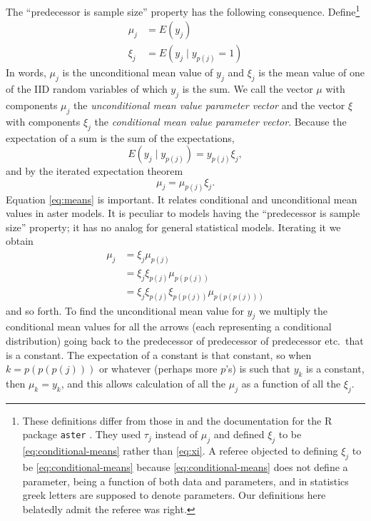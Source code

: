 \documentclass[11pt]{article}
\begin{document}
The ``predecessor is sample size'' property has the following consequence.
Define\footnote{These definitions differ from those in \citet{aster1} and the
documentation for the R package \texttt{aster} \citep{aster-package}.  They used
$\tau_j$ instead of $\mu_j$ and defined $\xi_j$ to
be \eqref{eq:conditional-means} rather than \eqref{eq:xi}.  A referee objected
to defining $\xi_j$ to be \eqref{eq:conditional-means} because
\eqref{eq:conditional-means} does not define a parameter, being a function
of both data and parameters, and in statistics greek letters are supposed to
denote parameters.  Our definitions here belatedly admit the referee was right.}
\begin{subequations}
\begin{align}
   \mu_j & = E(y_j)
   \\
   \xi_j & = E(y_j \mid y_{p(j)} = 1)
   \label{eq:xi}
\end{align}
\end{subequations}
In words, $\mu_j$ is the unconditional mean value of $y_j$ and $\xi_j$ is
the mean value of one of the IID random variables of which $y_j$
is the sum.  We call the vector $\mu$ with components $\mu_j$ the
\emph{unconditional mean value parameter vector}
and the vector $\xi$ with components $\xi_j$
the \emph{conditional mean value parameter vector}.
Because the expectation of a sum is
the sum of the expectations,
\begin{equation} \label{eq:conditional-means}
   E(y_j \mid y_{p(j)}) = y_{p(j)} \xi_j,
\end{equation}
and by the iterated expectation theorem
\begin{equation} \label{eq:means}
   \mu_j = \mu_{p(j)} \xi_j.
\end{equation}
Equation \eqref{eq:means} is important.  It relates conditional
and unconditional mean values in aster models.  It is peculiar to models
having the ``predecessor is sample size'' property; it has no analog
for general statistical models.  Iterating it we obtain
\begin{equation} \label{eq:xi-to-mu}
\begin{split}
   \mu_j & = \xi_j \mu_{p(j)}
   \\
   & = \xi_j \xi_{p(j)} \mu_{p(p(j))}
   \\
   & = \xi_j \xi_{p(j)} \xi_{p(p(j))} \mu_{p(p(p(j)))}
\end{split}
\end{equation}
and so forth.  To find the unconditional mean value for $y_j$ we multiply
the conditional mean values for all the arrows (each representing a conditional
distribution) going back to the predecessor of predecessor of predecessor etc.\
that is a constant.  The expectation of a constant is that constant, so
when $k = p(p(p(j)))$ or whatever (perhaps more $p$'s) is such that $y_k$ is
a constant, then $\mu_k = y_k$, and this allows
calculation of all the $\mu_j$ as a function of all the $\xi_j$.
\end{document}
